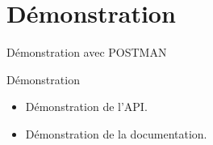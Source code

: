 \section{Démonstration}

\begin{frame}{Démonstration avec POSTMAN}
  \begin{block}{Démonstration}
    \begin{itemize}
    \item Démonstration de l'API.
    \item Démonstration de la documentation.
    \end{itemize}
  \end{block}
\end{frame}
